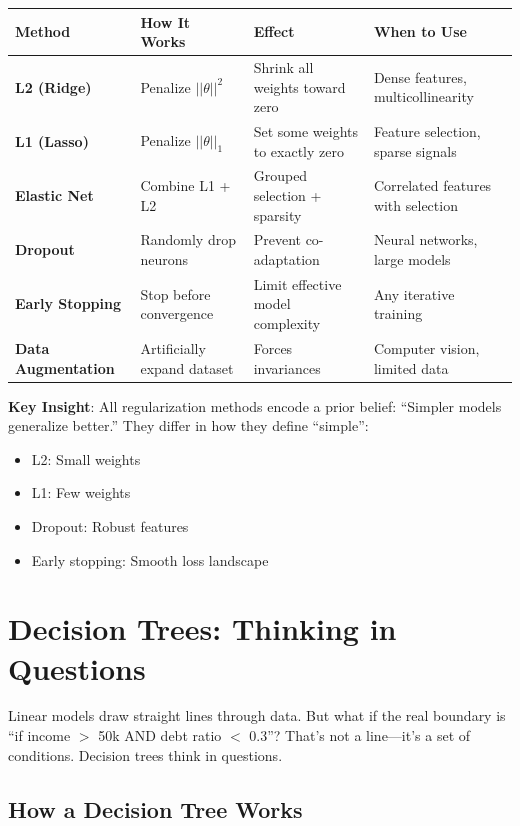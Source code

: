 \begin{table}[h]
\centering
\small
\begin{tabular}{p{2.5cm}p{3.5cm}p{2.5cm}p{3.5cm}}
\toprule
\textbf{Method} & \textbf{How It Works} & \textbf{Effect} & \textbf{When to Use} \\
\midrule
\textbf{L2 (Ridge)} & Penalize $||\theta||^2$ & Shrink all weights toward zero & Dense features, multicollinearity \\
\textbf{L1 (Lasso)} & Penalize $||\theta||_1$ & Set some weights to exactly zero & Feature selection, sparse signals \\
\textbf{Elastic Net} & Combine L1 + L2 & Grouped selection + sparsity & Correlated features with selection \\
\textbf{Dropout} & Randomly drop neurons & Prevent co-adaptation & Neural networks, large models \\
\textbf{Early Stopping} & Stop before convergence & Limit effective model complexity & Any iterative training \\
\textbf{Data Augmentation} & Artificially expand dataset & Forces invariances & Computer vision, limited data \\
\bottomrule
\end{tabular}
\end{table}

\begin{insightbox}
\textbf{Key Insight}: All regularization methods encode a prior belief: ``Simpler models generalize better.'' They differ in how they define ``simple'':
\begin{itemize}
    \item L2: Small weights
    \item L1: Few weights
    \item Dropout: Robust features
    \item Early stopping: Smooth loss landscape
\end{itemize}
\end{insightbox}

\section{Decision Trees: Thinking in Questions}

Linear models draw straight lines through data. But what if the real boundary is ``if income $>$ 50k AND debt ratio $<$ 0.3''? That's not a line---it's a set of conditions. Decision trees think in questions.

\subsection{How a Decision Tree Works}

